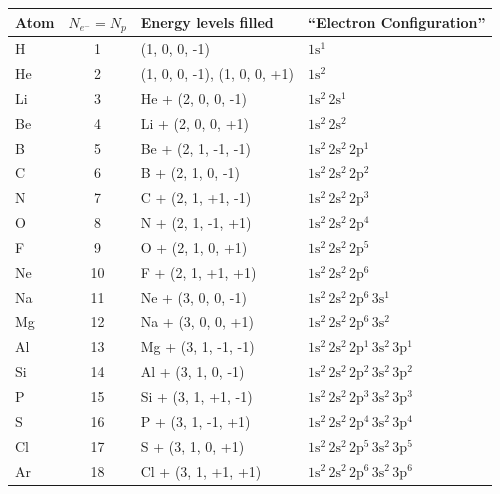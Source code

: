 \documentclass[12pt]{article}
\begin{document}
\begin{enumerate}
%
\renewcommand{\arraystretch}{1.4}
\begin{center}
\begin{tabular}{|l|c|l|l|}
\hline
{\bf Atom}  & $N_{e^-} = N_p$ & {\bf Energy levels filled} \hspace{1cm} & {\bf ``Electron Configuration''} \hspace {0.5cm} \\
\hline
\hline
H & 1 & (1, 0, 0, -1) & $1 \text{s}^1$\\
\hline
He & 2 & (1, 0, 0, -1),  (1, 0, 0, +1) & $1 \text{s}^2$\\
\hline
\hline
Li & 3 & He + (2, 0, 0, -1) & $1 \text{s}^2  \, 2 \text{s}^1$\\
\hline
Be & 4 & Li + (2, 0, 0, +1) & $1 \text{s}^2 \, 2 \text{s}^2$\\
\hline
B & 5 & Be + (2, 1, -1, -1) & $1 \text{s}^2 \, 2 \text{s}^2 \, 2 \text{p}^1$\\
\hline
C & 6 & B + (2, 1, 0, -1) & $1 \text{s}^2 \, 2 \text{s}^2 \, 2 \text{p}^2$\\
\hline
N &7 & C + (2, 1, +1, -1) & $1 \text{s}^2 \, 2 \text{s}^2 \, 2 \text{p}^3$\\
\hline
O & 8 & N + (2, 1, -1, +1) & $1 \text{s}^2 \, 2 \text{s}^2 \, 2 \text{p}^4$\\
\hline
F & 9 & O + (2, 1, 0, +1) & $1 \text{s}^2 \, 2 \text{s}^2 \, 2 \text{p}^5$\\
\hline
Ne & 10 & F + (2, 1, +1, +1) & $1 \text{s}^2 \, 2 \text{s}^2 \, 2 \text{p}^6$\\
\hline
\hline
Na & 11 & Ne + (3, 0, 0, -1) & $1 \text{s}^2 \, 2 \text{s}^2 \, 2 \text{p}^6 \, 3\text{s}^1$ \\
\hline
Mg & 12 & Na + (3, 0, 0, +1) & $1 \text{s}^2 \, 2 \text{s}^2 \, 2 \text{p}^6 \, 3\text{s}^2$ \\
\hline
Al & 13 & Mg + (3, 1, -1, -1) & $1 \text{s}^2 \, 2 \text{s}^2 \, 2 \text{p}^1\, 3\text{s}^2 \, 3\text{p}^1$ \\
\hline
Si & 14 & Al + (3, 1, 0, -1) & $1 \text{s}^2 \, 2 \text{s}^2 \, 2 \text{p}^2\, 3\text{s}^2 \, 3\text{p}^2$ \\
\hline
P & 15 & Si + (3, 1, +1, -1) & $1 \text{s}^2 \, 2 \text{s}^2 \, 2 \text{p}^3 \, 3\text{s}^2 \, 3\text{p}^3$ \\
\hline
S & 16 & P + (3, 1, -1, +1) & $1 \text{s}^2 \, 2 \text{s}^2 \, 2 \text{p}^4 \, 3\text{s}^2 \, 3\text{p}^4$ \\
\hline
Cl & 17 & S  + (3, 1, 0, +1) & $1 \text{s}^2 \, 2 \text{s}^2 \, 2 \text{p}^5 \, 3\text{s}^2 \, 3\text{p}^5$ \\
\hline
Ar & 18 & Cl + (3, 1, +1, +1) & $1 \text{s}^2 \, 2 \text{s}^2 \, 2 \text{p}^6 \, 3\text{s}^2 \, 3\text{p}^6$ \\
\hline
\end{tabular}
\end{center}



\end{enumerate}
\end{document}
